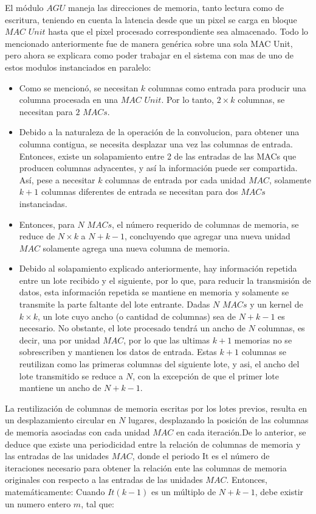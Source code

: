 El módulo $AGU$ maneja las direcciones de memoria, tanto lectura como de escritura, teniendo en cuenta la latencia desde que un pixel se carga en bloque $MAC$ $Unit$ hasta que el pixel procesado correspondiente sea almacenado.
Todo lo mencionado anteriormente fue de manera genérica sobre una sola MAC Unit, pero ahora se explicara como poder trabajar en el sistema con mas de uno de estos modulos instanciados en paralelo:

\begin{itemize}
\item Como se mencionó,  se necesitan $k$ columnas como entrada para producir una columna procesada en una $MAC$ $Unit$. Por lo tanto, $2 \times k$ columnas, se necesitan para $2$ $MACs$.
\item Debido a la naturaleza de la operación de la convolucion, para obtener una columna contigua, se necesita desplazar una vez las columnas de entrada. Entonces, existe un solapamiento entre 2 de las entradas de las MACs que producen columnas adyacentes, y así la información puede ser compartida.
  Así, pese a necesitar $k$ columnas de entrada por cada unidad $MAC$, solamente $k+1$ columnas diferentes de entrada se necesitan para dos $MACs$ instanciadas.
\item Entonces, para $N$ $MACs$, el número requerido de columnas de memoria, se reduce de $N \times k$ a $N+k-1$, concluyendo que agregar una nueva unidad $MAC$ solamente agrega una nueva columna de memoria.
\item Debido al solapamiento explicado anteriormente, hay información repetida entre un lote recibido y el siguiente, por lo que, para reducir la transmisión de datos, esta información repetida se mantiene en memoria y solamente se transmite la parte faltante del lote entrante.
Dadas $N$ $MACs$ y  un kernel de $k \times k$, un lote cuyo ancho (o cantidad de columnas) sea de $N+k-1$ es necesario. No obstante, el lote procesado tendrá un ancho de  $N$ columnas, es decir, una por unidad $MAC$, por lo que las ultimas $k+1$ memorias no se sobrescriben y mantienen los datos de entrada. Estas $k+1$ columnas se reutilizan como las primeras columnas del siguiente lote, y asi, el ancho del lote transmitido se reduce a $N$, con la excepción de que el primer lote mantiene un ancho de $N+k-1$.
\end{itemize}

La reutilización de columnas de memoria escritas por los lotes previos, resulta en un desplazamiento circular en $N$ lugares, desplazando la posición de las columnas de memoria asociadas con cada unidad $MAC$ en cada iteración.De lo anterior, se deduce que existe una periodicidad entre la relación de columnas de memoria y las entradas de las unidades $MAC$, donde el periodo It es el número de iteraciones necesario para obtener la relación ente las columnas de memoria originales con respecto a las entradas de las unidades $MAC$.
Entonces, matemáticamente: Cuando $It(k-1)$ es un múltiplo de $N+k-1$, debe existir un numero entero $m$, tal que:

